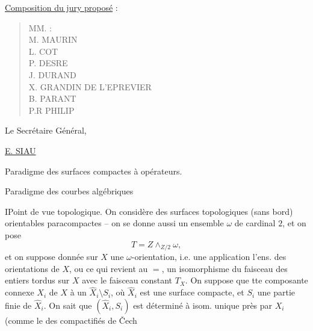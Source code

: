 \uline{Composition du jury proposé} :
\begin{quote}MM. :\\M. MAURIN\\L. COT\\P. DESRE\\J. DURAND\\X. GRANDIN DE L'EPREVIER\\B. PARANT\\P.R PHILIP\end{quote}
\begin{flushright}Le Secrétaire Général,\end{flushright}
\begin{flushright}\uline{E. SIAU}\end{flushright}

Paradigme 
des surfaces compactes
à opérateurs.

Paradigme des courbes algébriques

I\quad Point de vue topologique.
On considère des surfaces topologiques (sans bord)
orientables paracompactes  -- on se donne
 aussi un ensemble $\omega$ de cardinal $2$,
et on pose
\[T=Z\wedge_{Z/2}\omega,\]
et on suppose donnée sur $X$ une $\omega$-orientation,
i.e. une application
l'ens. des orientations de $X$, ou ce
qui revient au $=$, un isomorphisme
du faisceau des entiers tordus sur $X$
avec le faisceau constant $T_X$.
On suppose que tte composante connexe
$X_i$ de $X$   à un
$\widehat X_i\setminus S_i$, où $\widehat X_i$ est une surface
compacte, et $S_i$ une partie finie de
$\widehat X_i$. On sait que $(\widehat X_i,S_i)$ est déterminé
à isom. unique près par $X_i$
(comme le  des compactifiés de Čech

